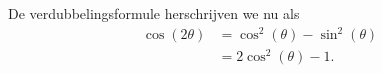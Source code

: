 \documentclass{article}
\begin{document}
    De verdubbelingsformule herschrijven we nu als
    \begin{align*}
        \cos(2\theta) &= \cos^2(\theta) - \sin^2(\theta)\\
        &= 2\cos^2(\theta)-1.\tag{$ * $}
    \end{align*}
\end{document}
